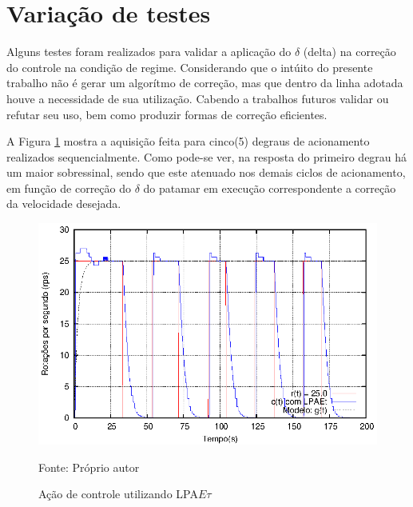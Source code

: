 






\section{Variação de testes}

Alguns testes foram realizados para validar a aplicação do $\delta$
(delta) na correção do controle na condição de regime.
Considerando que o intúito do presente trabalho não é gerar um
algorítmo de correção, mas que dentro da linha adotada houve a
necessidade de sua utilização. Cabendo a trabalhos futuros validar ou
refutar seu uso, bem como produzir formas de correção eficientes. 

A Figura \ref{fig:acaoLPAEtDelta} mostra a aquisição feita para
cinco(5) degraus de acionamento realizados sequencialmente.
Como pode-se ver, na resposta do primeiro degrau há um maior
sobressinal, sendo que este atenuado nos demais ciclos de acionamento,
em função de correção do $\delta$ do patamar em execução
correspondente a correção da velocidade desejada.

\begin{figure}[!htb]%
\caption{Ação de controle utilizando LPA$E\tau$}
\vspace{-1cm}\center\includegraphics[scale=1.6]{./imagens/LPAEt-delta.eps}
\label{fig:acaoLPAEtDelta}

{\small Fonte: Próprio autor}
\end{figure}

